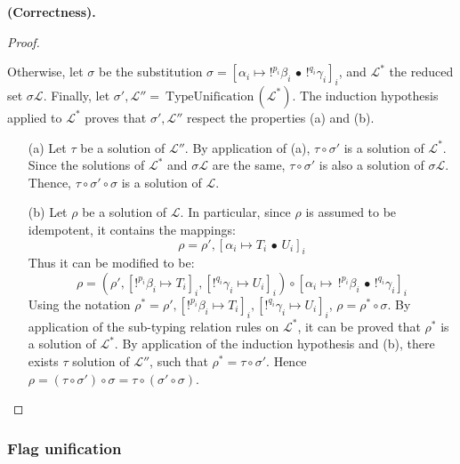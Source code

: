 \begin{thm}{\bf (Correctness).}
\begin{proof}
\begin{itemize}
				Otherwise, let $\sigma$ be the substitution $\sigma = [\alpha_i \mapsto !^{p_i}\beta_i \,\bullet\, !^{q_i}\gamma_i]_i$, and
				$\mathcal{L}^*$ the reduced set $\sigma \mathcal{L}$. Finally, let $\sigma', \mathcal{L''} = ~\text{TypeUnification}\,(\mathcal{L}^*)$.
				The induction hypothesis applied to $\mathcal{L}^*$ proves that $\sigma', \mathcal{L''}$ respect the properties (a) and (b).
					\begin{itemize}
						\item[(a)] Let $\tau$ be a solution of $\mathcal{L''}$. By application of (a), $\tau \circ \sigma'$ is a solution of $\mathcal{L}^*$.
							Since the solutions of $\mathcal{L}^*$ and $\sigma \mathcal{L}$ are the same, $\tau \circ \sigma'$ is also a solution of
							$\sigma \mathcal{L}$. Thence, $\tau \circ \sigma' \circ \sigma$ is a solution of $\mathcal{L}$.
							
						\item[(b)] Let $\rho$ be a solution of $\mathcal{L}$. In particular, since $\rho$ is assumed to be idempotent,
							it contains the mappings:
								$$\rho = \rho', [\alpha_i \mapsto T_i \,\bullet\, U_i]_i$$
							Thus it can be modified to be:
								$$\rho = (\rho',[!^{p_i}\beta_i \mapsto T_i]_i, [!^{q_i}\gamma_i \mapsto U_i]_i) \circ
									[\alpha_i \mapsto \,!^{p_i}\beta_i \,\bullet\, !^{q_i}\gamma_i]_i$$
							Using the notation $\rho^* = \rho' ,[!^{p_i}\beta_i \mapsto T_i]_i,[!^{q_i}\gamma_i \mapsto U_i]_i$,
							$\rho = \rho^* \circ \sigma$. By application of the sub-typing relation rules on $\mathcal{L}^*$, it can be proved
							that $\rho^*$ is a solution of $\mathcal{L}^*$. By application of the induction hypothesis and (b), there exists
							$\tau$ solution of $\mathcal{L''}$, such that $\rho^* = \tau \circ \sigma'$. Hence $\rho = (\tau \circ \sigma') \circ \sigma =
							\tau \circ (\sigma' \circ \sigma)$.
					\end{itemize}
		\end{itemize}
	\end{proof}
\end{thm}

\subsubsection{Flag unification}\label{sssec-flag}

